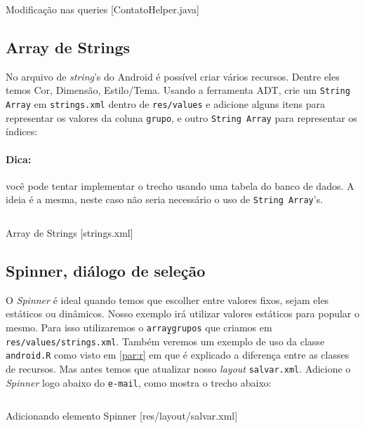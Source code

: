 \begin{listing}[H]
  \inputminted[linenos=true,frame=bottomline,tabsize=3]{ java }{ source/ContatoHelper-7.java }
  \caption{Modificação nas queries [ContatoHelper.java]}
\end{listing}

\subsection{Array de Strings}

No arquivo de \textit{string}'s do Android é possível criar vários recursos. Dentre eles temos Cor,
Dimensão, Estilo/Tema. Usando a ferramenta ADT, crie um \texttt{String Array} em \texttt{strings.xml}
dentro de \texttt{res/values} e adicione alguns itens para representar os valores da coluna \texttt{grupo},
e outro \texttt{String Array} para representar os índices:

\paragraph{Dica:} você pode tentar implementar o trecho usando uma tabela do banco de dados. A ideia
é a mesma, neste caso não seria necessário o uso de \texttt{String Array}'s.

\begin{listing}[H]
  \inputminted[linenos=true,frame=bottomline,tabsize=3]{ xml }{ source/strings-1.xml }
  \caption{Array de Strings [strings.xml]}
\end{listing}

\subsection{Spinner, diálogo de seleção}

O \textit{Spinner} é ideal quando temos que escolher entre valores fixos, sejam eles estáticos ou dinâmicos.
Nosso exemplo irá utilizar valores estáticos para popular o mesmo. Para isso utilizaremos o
\texttt{array\b{ }grupos} que criamos em \texttt{res/values/strings.xml}. Também veremos um exemplo
de uso da classe \texttt{android.R} como visto em \ref{par:r} em que é explicado a diferença entre
as classes de recursos. Mas antes temos que atualizar nosso \textit{layout} \texttt{salvar.xml}.
Adicione o \textit{Spinner} logo abaixo do \texttt{e-mail}, como mostra o trecho abaixo:

\begin{listing}[H]
  \inputminted[linenos=true,frame=bottomline,tabsize=3]{ xml }{ source/salvar-3.xml }
  \caption{Adicionando elemento Spinner [res/layout/salvar.xml]}
\end{listing}

